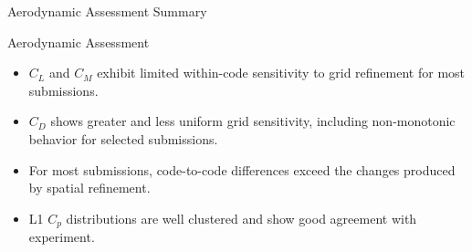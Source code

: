 \begin{frame}{\small Aerodynamic Assessment Summary}
\scriptsize

\begin{alertblock}{\scriptsize Aerodynamic Assessment}
\begin{itemize}
    \item $C_L$ and $C_M$ exhibit limited within-code sensitivity to grid refinement for most submissions.
    
    \item $C_D$ shows greater and less uniform grid sensitivity, including non-monotonic behavior for selected submissions.
    
    \item For most submissions, code-to-code differences exceed the changes produced by spatial refinement.
    
    \item L1 $C_p$ distributions are well clustered and show good agreement with experiment.
\end{itemize}
\end{alertblock}

\end{frame}